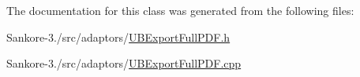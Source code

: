 The documentation for this class was generated from the following files\-:\begin{DoxyCompactItemize}
\item 
Sankore-\/3./src/adaptors/\hyperlink{_u_b_export_full_p_d_f_8h}{U\-B\-Export\-Full\-P\-D\-F.\-h}\item 
Sankore-\/3./src/adaptors/\hyperlink{_u_b_export_full_p_d_f_8cpp}{U\-B\-Export\-Full\-P\-D\-F.\-cpp}\end{DoxyCompactItemize}
